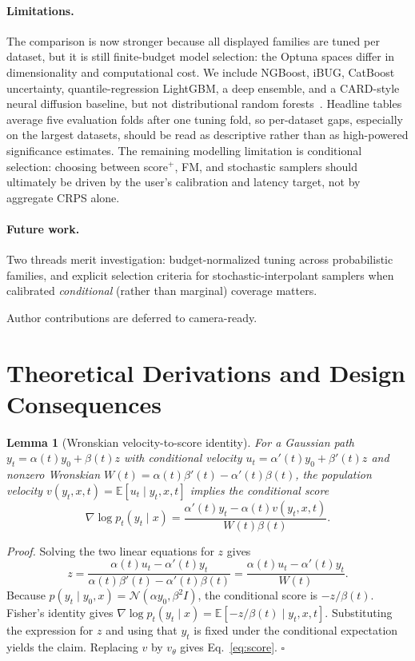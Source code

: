 \documentclass{tpm2026}
\newcommand{\E}{\mathbb{E}}
\newcommand{\Norm}{\mathcal{N}}
\newtheorem{lemma}{Lemma}
\begin{document}
\paragraph{Limitations.} The comparison is now stronger because all displayed families are tuned per dataset, but it is still finite-budget model selection: the Optuna spaces differ in dimensionality and computational cost. We include NGBoost, iBUG, CatBoost uncertainty, quantile-regression LightGBM, a deep ensemble, and a CARD-style neural diffusion baseline, but not distributional random forests~\citep{cevid2022drf}. Headline tables average five evaluation folds after one tuning fold, so per-dataset gaps, especially on the largest datasets, should be read as descriptive rather than as high-powered significance estimates. The remaining modelling limitation is conditional selection: choosing between score$^+$, FM, and stochastic samplers should ultimately be driven by the user's calibration and latency target, not by aggregate CRPS alone.

\paragraph{Future work.} Two threads merit investigation: budget-normalized tuning across probabilistic families, and explicit selection criteria for stochastic-interpolant samplers when calibrated \emph{conditional} (rather than marginal) coverage matters.

\begin{contributions}
Author contributions are deferred to camera-ready.
\end{contributions}



\appendix
\onecolumn

\section{Theoretical Derivations and Design Consequences}\label{app:theory}

\begin{lemma}[Wronskian velocity-to-score identity]\label{lem:wronskian-score}
For a Gaussian path $y_t=\alpha(t)y_0+\beta(t)z$ with conditional velocity $u_t=\alpha'(t)y_0+\beta'(t)z$ and nonzero Wronskian $W(t)=\alpha(t)\beta'(t)-\alpha'(t)\beta(t)$, the population velocity $v(y_t,x,t)=\E[u_t\mid y_t,x,t]$ implies the conditional score
\[
\nabla \log p_t(y_t\mid x)=\frac{\alpha'(t)y_t-\alpha(t)v(y_t,x,t)}{W(t)\beta(t)}.
\]
\end{lemma}
\emph{Proof.} Solving the two linear equations for $z$ gives
\[
z=\frac{\alpha(t)u_t-\alpha'(t)y_t}{\alpha(t)\beta'(t)-\alpha'(t)\beta(t)}
  =\frac{\alpha(t)u_t-\alpha'(t)y_t}{W(t)}.
\]
Because $p(y_t\mid y_0,x)=\Norm(\alpha y_0,\beta^2 I)$, the conditional score is $-z/\beta(t)$. Fisher's identity gives $\nabla\log p_t(y_t\mid x)=\E[-z/\beta(t)\mid y_t,x,t]$. Substituting the expression for $z$ and using that $y_t$ is fixed under the conditional expectation yields the claim. Replacing $v$ by $v_\theta$ gives Eq.~\eqref{eq:score}. \hfill$\square$
\end{document}
